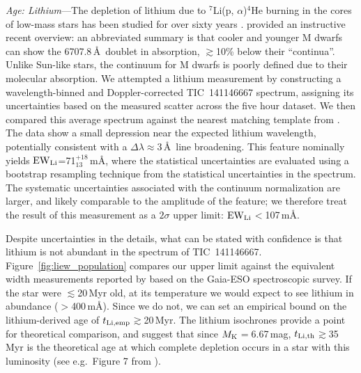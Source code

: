 \documentclass{nature3}
\begin{document}
\begin{methods}
{\it Age: Lithium}---The depletion of lithium due to $^7$Li(p,
$\alpha$)$^4$He burning in the cores of low-mass stars has been studied
for over sixty years \cite{Hayashi1963,Bildsten1997,Burke2004}.
\cite{Wood2023} provided an instructive recent overview: an abbreviated
summary is that cooler and younger M dwarfs can show the 6707.8\,\AA\
doublet in absorption, $\gtrsim$10\% below their ``continua''.  Unlike
Sun-like stars, the continuum for M dwarfs is poorly defined due to
their molecular absorption.  We attempted a lithium measurement by
constructing a wavelength-binned and Doppler-corrected TIC~141146667
spectrum, assigning its uncertainties based on the measured scatter
across the five hour dataset.  We then compared this average spectrum
against the nearest matching template from \cite{Bochanski2007}.  The
data show a small depression near the expected lithium wavelength,
potentially consistent with a $\Delta \lambda$$\approx$3\,\AA\ line
broadening.  This feature nominally yields ${\rm EW}_{\rm
Li}$=71$^{+18}_{13}$\,m\AA, where the statistical uncertainties are
evaluated using a bootstrap resampling technique from the statistical
uncertainties in the spectrum.  The systematic uncertainties associated
with the continuum normalization are larger, and likely comparable to
the amplitude of the feature; we therefore treat the result of this
measurement as a $2\sigma$ upper limit: ${\rm EW}_{\rm Li}$$<$107\,m\AA.

Despite uncertainties in the details, what can be stated with confidence
is that lithium is not abundant in the spectrum of TIC~141146667.
Figure~\ref{fig:liew_population} compares our upper limit against the
equivalent width measurements reported by \cite{Jeffries2023}
based on the Gaia-ESO spectroscopic survey.  If the star were
$\lesssim$20\,Myr old, at its temperature we would expect to see
lithium in abundance ($>$400\,m\AA).  Since we do not, we can set an
empirical bound on the lithium-derived age of $t_{\rm
Li,emp}$$\gtrsim$20\,Myr.  The \cite{Feiden2016} lithium isochrones
provide a point for theoretical comparison, and suggest that since
$M_{\rm K}$$=$6.67\,mag, $t_{\rm Li,th}$$\gtrsim$35\,Myr is the
theoretical age at which complete depletion occurs in a star with this
luminosity (see e.g.~Figure 7 from \cite{Wood2023}).




\end{methods}
\end{document}
